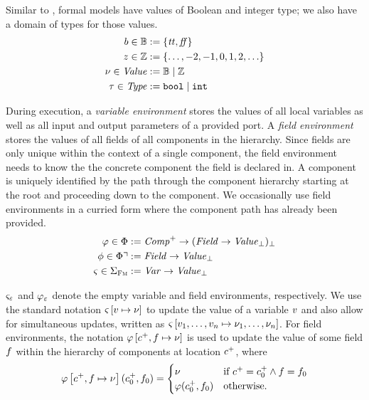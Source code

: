 \documentclass[a4paper,10pt,english]{article}
\begin{document}
Similar to \Fil, formal models have values of Boolean and integer type; we also have a domain of types
for those values.
\begin{align*}
    b \in \mathbb{B} &:= \{ \mathit{tt}, \mathit{ff} \}
    \\
    z \in \mathbb{Z} &:= \{ \ldots, -2, -1, 0, 1, 2, \ldots \}
    \\
    \nu \in \mathit{Value} &:= \mathbb{B} \mid \mathbb{Z}
    \\
	\tau \in \mathit{Type} &:= \mathtt{bool} \mid \mathtt{int}
\end{align*}

During execution, a \textit{variable environment} stores the values of all local variables as well as all input and output
parameters of a provided port.
A \textit{field environment} stores the values of all fields of all components in the hierarchy. Since fields are only unique
within the context of a single component, the field environment needs to know the the concrete component the field is declared
in. A component is uniquely identified by the path through the component hierarchy starting at the root and proceeding down to the
component. We occasionally use field environments in a curried form where the component path has already been provided.
\begin{align*}
	\varphi \in \Phi &:= \mathit{Comp}^+ \rightarrow (\mathit{Field} \rightarrow \mathit{Value}_\bot)_\bot \\
	\phi \in \Phi\urcorner &:= \mathit{Field} \rightarrow \mathit{Value}_\bot \\
	\varsigma \in \Sigma_\textsc{Fm} &:= \mathit{Var} \rightarrow \mathit{Value}_\bot
\end{align*}

$\varsigma_\varepsilon$ and $\varphi_\varepsilon$ denote the empty variable and field environments, respectively. We use the standard
notation $\varsigma\left[v \mapsto \nu \right]$ to update the value of a variable $v$ and also allow for simultaneous
updates, written as $\varsigma\left[v_1, \ldots, v_n \mapsto \nu_1, \ldots, \nu_n\right]$.
For field environments, the notation $\varphi\left[c^+, f \mapsto \nu \right]$ is used to update the value of
some field $f$ within the hierarchy of components at location $c^+$, where
\begin{equation*}
	\varphi\left[c^+, f \mapsto \nu \right](c^+_0, f_0) =
		\begin{cases}
			\nu & \text{if } c^+ = c^+_0 \wedge f = f_0 \\
			\varphi(c^+_0, f_0) & \text{otherwise.}
		\end{cases}
\end{equation*}
\end{document}
